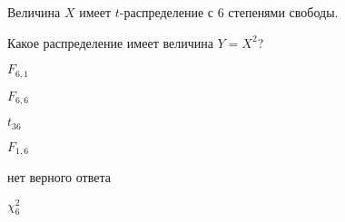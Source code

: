 
\begin{question}
Величина \(X\) имеет \(t\)-распределение с 6 степенями свободы.

Какое распределение имеет величина \(Y = X^2\)?
\begin{answerlist}
  \item \(F_{6, 1}\)
  \item \(F_{6, 6}\)
  \item \(t_{36}\)
  \item \(F_{1, 6}\)
  \item нет верного ответа
  \item \(\chi^2_{6}\)
\end{answerlist}
\end{question}


